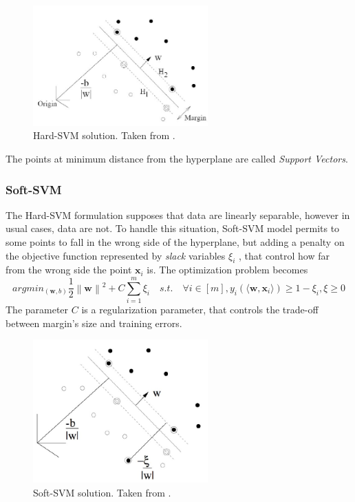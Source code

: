 \begin{figure}[ht]
	\centering
	\includegraphics[width=0.6\textwidth]{figures/hard-svm.jpg}
	\caption{Hard-SVM solution. Taken from \cite{Pinault2015ModellingWK}.}
	\label{fig:hard-svm}
\end{figure}

The points at minimum distance from the hyperplane are called \textit{Support Vectors}.

\subsubsection{Soft-SVM}

The Hard-\ac{SVM} formulation supposes that data are linearly separable, however in usual cases, data are not. To handle this situation, Soft-\ac{SVM} model permits to some points to fall in the wrong side of the hyperplane, but adding a penalty on the objective function represented by \textit{slack} variables $\xi _i$ , that control how far from the wrong side the point $\mathbf{x}_i$ is. The optimization problem becomes
\[ argmin_{(\mathbf{w}, b)} \frac{1}{2} \left\lVert \mathbf{w} \right\rVert ^2 + C \sum_{i=1}^{m} \xi_i \quad s.t. \quad \forall i \in [m], y_i (\langle \mathbf{w}, \mathbf{x}_i \rangle) \ge 1 - \xi_i , \xi \ge 0  \]
The parameter $C$ is a regularization parameter, that controls the trade-off between margin's size and training errors. 

\begin{figure}[ht]
	\centering
	\includegraphics[width=0.6\textwidth]{figures/soft-svm.jpg}
	\caption{Soft-SVM solution. Taken from \cite{Pinault2015ModellingWK}.}%
	\label{fig:soft-svm}
\end{figure}


